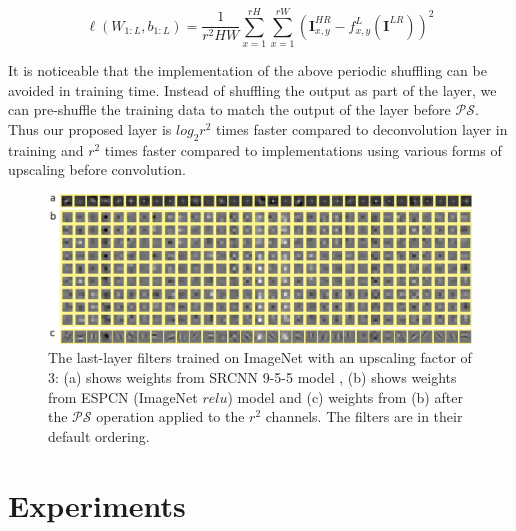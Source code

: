 \documentclass[10pt,twocolumn,letterpaper]{article}
\newcommand{\lrimage}[0]{\mathbf{I}^{LR}}
\newcommand{\hrimage}[0]{\mathbf{I}^{HR}}
\newcommand{\periodicshufflingoperator}[0]{\mathcal{PS}}
\begin{document}
\begin{equation}
	\ell(W_{1:L},b_{1:L}) = \frac{1}{r^2 H W}\sum_{x=1}^{rH} \sum_{x=1}^{rW} \left( \hrimage_{x,y} - f^L_{x,y}(\lrimage)\right)^2
\end{equation}

It is noticeable that the implementation of the above periodic shuffling can be avoided in training time. Instead of shuffling the output as part of the layer, we can pre-shuffle the training data to match the output of the layer before $\periodicshufflingoperator$. Thus our proposed layer is $log_2 r^2$ times faster compared to deconvolution layer in training and $r^2$ times faster compared to implementations using various forms of upscaling before convolution.

\begin{figure}[htbp]
\begin{center}
\includegraphics[width=\linewidth]{figures//lastLayerCombinedFinal.jpg}
\caption{The last-layer filters trained on ImageNet with an upscaling factor of 3: (a) shows weights from SRCNN 9-5-5 model \cite{dong2015image}, (b) shows weights from ESPCN (ImageNet $relu$) model and (c) weights from (b) after the $\periodicshufflingoperator$ operation applied to the $r^2$ channels. The filters are in their default ordering.}
\label{fig:lastlayerweights}
\end{center}
\end{figure}

%
\section{Experiments}
%
\end{document}
